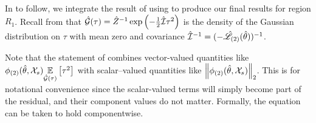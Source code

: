 In  to follow, we integrate the result of
 using  to
produce our final results for region $R_1$. Recall from
 that $\hat{\mathcal{G}}(\tau) = \hat{Z}^{-1}
\exp\left(-\frac{1}{2} \hat{\mathcal{I}} \tau^2 \right)$ is the density of the Gaussian
distribution on $\tau$ with mean zero and covariance $\hat{\mathcal{I}}^{-1} =
(-\hat{\mathscr{L}}_{(2)}(\hat\theta))^{-1}$.

Note that the statement of  combines vector-valued
quantities like $\phi_{(2)}(\hat\theta, {\mathcal{X}}_s) \underset{\hat{\mathcal{G}}(\tau)}{\mathbb{E}}\left[\tau^2\right]$ with
scalar--valued quantities like $\left\Vert \phi_{(2)}(\hat\theta, {\mathcal{X}}_s)\right\Vert_2$.  This is
for notational convenience since the scalar-valued terms will simply become part
of the residual, and their component values do not matter.  Formally, the
equation can be taken to hold componentwise.
%
